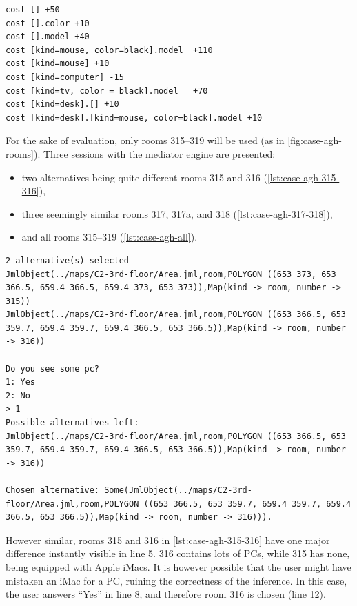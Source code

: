 \begin{lstlisting}[caption={Costs definitions used in the evaluated case..},label=lst:case-agh-costs]
cost [] +50
cost [].color +10
cost [].model +40
cost [kind=mouse, color=black].model  +110
cost [kind=mouse] +10
cost [kind=computer] -15
cost [kind=tv, color = black].model   +70
cost [kind=desk].[] +10
cost [kind=desk].[kind=mouse, color=black].model +10
\end{lstlisting}

For the sake of evaluation, only rooms 315--319 will be used (as in \cref{fig:case-agh-rooms}). Three sessions with the mediator engine are presented:

\begin{itemize}
	\item two alternatives being quite different rooms 315 and 316 (\cref{lst:case-agh-315-316}),
	\item three seemingly similar rooms 317, 317a, and 318 (\cref{lst:case-agh-317-318}),
	\item and all rooms 315--319 (\cref{lst:case-agh-all}).
\end{itemize}

\begin{lstlisting}[label={lst:case-agh-315-316},caption={Mediation between rooms 315 and 316.}]
2 alternative(s) selected
JmlObject(../maps/C2-3rd-floor/Area.jml,room,POLYGON ((653 373, 653 366.5, 659.4 366.5, 659.4 373, 653 373)),Map(kind -> room, number -> 315))
JmlObject(../maps/C2-3rd-floor/Area.jml,room,POLYGON ((653 366.5, 653 359.7, 659.4 359.7, 659.4 366.5, 653 366.5)),Map(kind -> room, number -> 316))

Do you see some pc?
1: Yes
2: No
> 1
Possible alternatives left:
JmlObject(../maps/C2-3rd-floor/Area.jml,room,POLYGON ((653 366.5, 653 359.7, 659.4 359.7, 659.4 366.5, 653 366.5)),Map(kind -> room, number -> 316))

Chosen alternative: Some(JmlObject(../maps/C2-3rd-floor/Area.jml,room,POLYGON ((653 366.5, 653 359.7, 659.4 359.7, 659.4 366.5, 653 366.5)),Map(kind -> room, number -> 316))).
\end{lstlisting}

However similar, rooms 315 and 316 in \cref{lst:case-agh-315-316} have one major difference instantly visible in line 5. 316 contains lots of PCs, while 315 has none, being equipped with Apple iMacs. It is however possible that the user might have mistaken an iMac for a PC, ruining the correctness of the inference. In this case, the user answers ``Yes'' in line 8, and therefore room 316 is chosen (line 12).

